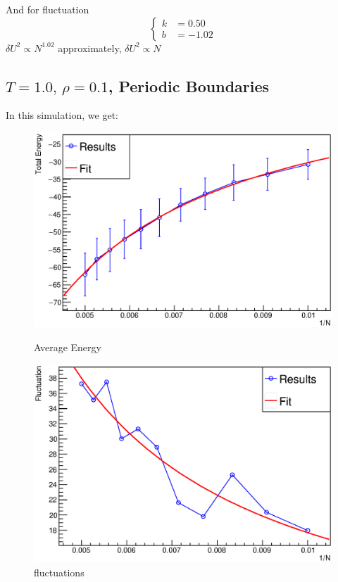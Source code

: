 \documentclass[UTF8,a4paper]{article}
\begin{document}
And for fluctuation
\begin{equation}
	\left\{
		\begin{aligned}
			k &= 0.50\\
			b &= -1.02
		\end{aligned}
	\right.
\end{equation}
$\delta U^2\propto N^{1.02}$ approximately, $\delta U^2\propto N$

\subsection{$T =1.0,\, \rho = 0.1$, Periodic Boundaries}
In this simulation, we get:
\begin{figure}[H]
	\centering
	\begin{minipage}[t]{0.45\textwidth}
		\centering
		\includegraphics[height=0.2\textheight]{Root Fit/fit_exp2.eps}
		\caption{Average Energy}
	\end{minipage}\hspace{0.5cm}
	\begin{minipage}[t]{0.45\textwidth}
		\centering
		\includegraphics[height=0.2\textheight]{Root Fit/fit_exp2_f.eps}
		\caption{fluctuations}
	\end{minipage}
\end{figure}
\end{document}
